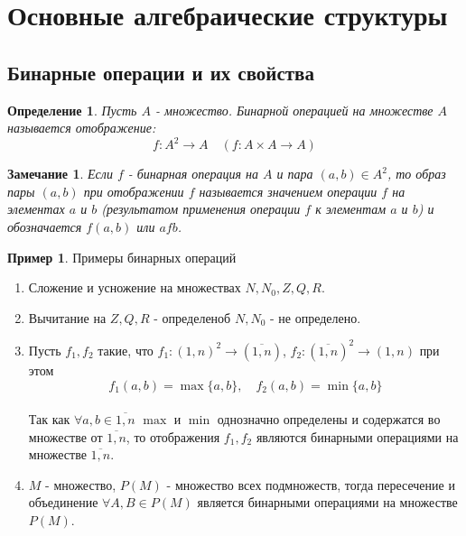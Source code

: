 \documentclass[12pt,oneside]{article}
\newtheorem{determ}[theorem]{Определение}
\newtheorem{ffff}[theorem]{Замечание}
\theoremstyle{definition}
\newtheorem{example}[theorem]{Пример}
\begin{document}
\tableofcontents


%
%
%
%
%
\newpage
\section{Основные алгебраические структуры}\label{ch_basic_alg_st}
\subsection{Бинарные операции и их свойства}

\begin{determ}
Пусть $A$ - множество. Бинарной операцией на множестве $A$ называется отображение:
\begin{equation}
f:A^2 \rightarrow A \quad (f: A \times A \rightarrow A)
\end{equation}
\end{determ}

\begin{ffff}
	Если $f$ - бинарная операция на $A$ и пара $(a,b) \in A^2$, то образ пары $(a,b)$ при отображении $f$ называется значением операции $f$ на элементах $a$ и $b$ (результатом применения операции $f$ к элементам $a$ и $b$) и обозначается $f(a,b)$ или $afb$.
\end{ffff}

\begin{example}\label{bin_examples}
	Примеры бинарных операций
	\begin{enumerate}
		\item Сложение и усножение на множествах $N, N_0, Z, Q, R$.
		\item Вычитание на $Z, Q, R$ - определеноб $N, N_0$ - не определено.
		\item Пусть $f_1, f_2$ такие, что $f_1:(1,n)^2 \rightarrow (\overline{1,n})$, $f_2:(\overline{1,n})^2 \rightarrow(1,n)$ при этом
		\begin{equation}
			f_1(a,b) = \max\{a,b\},\quad f_2(a,b) = \min\{a,b\}
		\end{equation}\\
		Так как $\forall a,b \in \overline{1,n}$ $\max$ и $\min$ однозначно определены и содержатся во множестве от $\overline{1,n}$, то отображения $f_1, f_2$ являются бинарными операциями на множестве $\overline{1,n}$.
		\item $M$ - множество, $P(M)$ - множество всех подмножеств, тогда пересечение и объединение $\forall A,B \in P(M)$ является бинарными операциями на множестве $P(M)$. 
	\end{enumerate}
\end{example}
\end{document}
